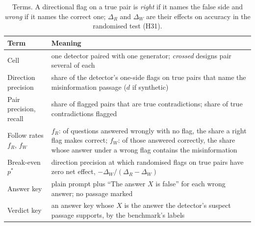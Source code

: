 \begin{table}[t]
\centering\scriptsize
\setlength{\tabcolsep}{3pt}
\begin{tabular}{@{}>{\raggedright\arraybackslash}p{1.6cm}>{\raggedright\arraybackslash}p{5.6cm}@{}}
\toprule
Term & Meaning \\
\midrule
Cell & one detector paired with one generator; \emph{crossed} designs pair several of each \\
Direction precision & share of the detector's one-side flags on true pairs that name the misinformation
passage ($d$ if synthetic) \\
Pair precision, recall & share of flagged pairs that are true contradictions; share of true contradictions
flagged \\
Follow rates $f_R$, $f_W$ & $f_R$: of questions answered wrongly with no flag, the share a right flag makes correct;
$f_W$: of those answered correctly, the share whose answer under a wrong flag contains the misinformation \\
Break-even $p^*$ & direction precision at which randomised flags on true pairs have zero net effect,
$-\Delta_W/(\Delta_R-\Delta_W)$ \\
Answer key & plain prompt plus ``The answer $X$ is false'' for each wrong answer; no passage marked \\
Verdict key & an answer key whose $X$ is the answer the detector's suspect passage supports, by the benchmark's
labels \\
\bottomrule
\end{tabular}
\caption{Terms. A directional flag on a true pair is \emph{right} if it names the false side and \emph{wrong} if it
names the correct one; $\Delta_R$ and $\Delta_W$ are their effects on accuracy in the randomised test (H31).}
\label{tab:terms}
\end{table}

